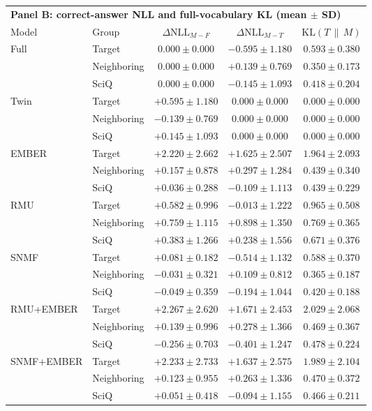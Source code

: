 \begin{table}[h]
  \vspace{1em}
  \begin{tabular}{llccc}
    \toprule
    \multicolumn{5}{l}{\textbf{Panel B: correct-answer NLL and full-vocabulary KL (mean $\pm$ SD)}} \\
    \cmidrule(lr){1-5}
    Model & Group & $\Delta\mathrm{NLL}_{M-F}$ & $\Delta\mathrm{NLL}_{M-T}$ & $\mathrm{KL}(T\,\|\,M)$ \\
    \midrule
    Full  & Target      & $0.000 \pm 0.000$ & $-0.595 \pm 1.180$ & $0.593 \pm 0.380$ \\
          & Neighboring & $0.000 \pm 0.000$ & $+0.139 \pm 0.769$ & $0.350 \pm 0.173$ \\
          & SciQ        & $0.000 \pm 0.000$ & $-0.145 \pm 1.093$ & $0.418 \pm 0.204$ \\
    Twin  & Target      & $+0.595 \pm 1.180$ & $0.000 \pm 0.000$ & $0.000 \pm 0.000$ \\
          & Neighboring & $-0.139 \pm 0.769$ & $0.000 \pm 0.000$ & $0.000 \pm 0.000$ \\
          & SciQ        & $+0.145 \pm 1.093$ & $0.000 \pm 0.000$ & $0.000 \pm 0.000$ \\
    EMBER & Target      & $+2.220 \pm 2.662$ & $+1.625 \pm 2.507$ & $1.964 \pm 2.093$ \\
          & Neighboring & $+0.157 \pm 0.878$ & $+0.297 \pm 1.284$ & $0.439 \pm 0.340$ \\
          & SciQ        & $\mathbf{+0.036 \pm 0.288}$ & $-0.109 \pm 1.113$ & $0.439 \pm 0.229$ \\
    RMU   & Target      & $+0.582 \pm 0.996$ & $\mathbf{-0.013 \pm 1.222}$ & $0.965 \pm 0.508$ \\
          & Neighboring & $+0.759 \pm 1.115$ & $+0.898 \pm 1.350$ & $0.769 \pm 0.365$ \\
          & SciQ        & $+0.383 \pm 1.266$ & $+0.238 \pm 1.556$ & $0.671 \pm 0.376$ \\
    SNMF  & Target      & $+0.081 \pm 0.182$ & $-0.514 \pm 1.132$ & $\mathbf{0.588 \pm 0.370}$ \\
          & Neighboring & $\mathbf{-0.031 \pm 0.321}$ & $\mathbf{+0.109 \pm 0.812}$ & $\mathbf{0.365 \pm 0.187}$ \\
          & SciQ        & $-0.049 \pm 0.359$ & $-0.194 \pm 1.044$ & $\mathbf{0.420 \pm 0.188}$ \\
    RMU+EMBER & Target      & $\mathbf{+2.267 \pm 2.620}$ & $+1.671 \pm 2.453$ & $2.029 \pm 2.068$ \\
          & Neighboring & $+0.139 \pm 0.996$ & $+0.278 \pm 1.366$ & $0.469 \pm 0.367$ \\
          & SciQ        & $-0.256 \pm 0.703$ & $-0.401 \pm 1.247$ & $0.478 \pm 0.224$ \\
    SNMF+EMBER & Target      & $+2.233 \pm 2.733$ & $+1.637 \pm 2.575$ & $1.989 \pm 2.104$ \\
          & Neighboring & $+0.123 \pm 0.955$ & $+0.263 \pm 1.336$ & $0.470 \pm 0.372$ \\
          & SciQ        & $+0.051 \pm 0.418$ & $\mathbf{-0.094 \pm 1.155}$ & $0.466 \pm 0.211$ \\
    \bottomrule
  \end{tabular}


\end{table}
